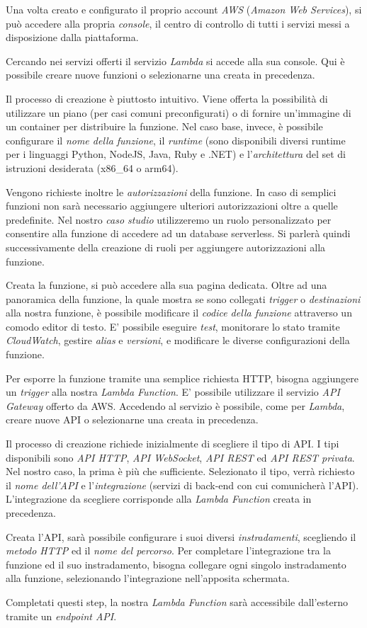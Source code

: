 Una volta creato e configurato il proprio account \textit{AWS} (\textit{Amazon Web Services}), si può accedere alla propria \textit{console}, il centro di controllo di tutti i servizi messi a disposizione dalla piattaforma.

Cercando nei servizi offerti il servizio \textit{Lambda} si accede alla sua console. Qui è possibile creare nuove funzioni o selezionarne una creata in precedenza.

Il processo di creazione è piuttosto intuitivo. Viene offerta la possibilità di utilizzare un piano (per casi comuni preconfigurati) o di fornire un'immagine di un container per distribuire la funzione. Nel caso base, invece, è possibile configurare il \textit{nome della funzione}, il \textit{runtime} (sono disponibili diversi runtime per i linguaggi Python, NodeJS, Java, Ruby e .NET) e l'\textit{architettura} del set di istruzioni desiderata (x86\_64 o arm64).

Vengono richieste inoltre le \textit{autorizzazioni} della funzione. In caso di semplici funzioni non sarà necessario aggiungere ulteriori autorizzazioni oltre a quelle predefinite. Nel nostro \textit{caso studio} utilizzeremo un ruolo personalizzato per consentire alla funzione di accedere ad un database serverless. Si parlerà quindi successivamente della creazione di ruoli per aggiungere autorizzazioni alla funzione.

Creata la funzione, si può accedere alla sua pagina dedicata. Oltre ad una panoramica della funzione, la quale mostra se sono collegati \textit{trigger} o \textit{destinazioni} alla nostra funzione, è possibile modificare il \textit{codice della funzione} attraverso un comodo editor di testo. E' possibile eseguire \textit{test}, monitorare lo stato tramite \textit{CloudWatch}, gestire \textit{alias} e \textit{versioni}, e modificare le diverse configurazioni della funzione.

Per esporre la funzione tramite una semplice richiesta HTTP, bisogna aggiungere un \textit{trigger} alla nostra \textit{Lambda Function}. E' possibile utilizzare il servizio \textit{API Gateway} offerto da AWS. Accedendo al servizio è possibile, come per \textit{Lambda}, creare nuove API o selezionarne una creata in precedenza.

Il processo di creazione richiede inizialmente di scegliere il tipo di API. I tipi disponibili sono \textit{API HTTP}, \textit{API WebSocket}, \textit{API REST} ed \textit{API REST privata}. Nel nostro caso, la prima è più che sufficiente.
Selezionato il tipo, verrà richiesto il \textit{nome dell'API} e l'\textit{integrazione} (servizi di back-end con cui comunicherà l'API). L'integrazione da scegliere corrisponde alla \textit{Lambda Function} creata in precedenza.

Creata l'API, sarà possibile configurare i suoi diversi \textit{instradamenti}, scegliendo il \textit{metodo HTTP} ed il \textit{nome del percorso}. Per completare l'integrazione tra la funzione ed il suo instradamento, bisogna collegare ogni singolo instradamento alla funzione, selezionando l'integrazione nell'apposita schermata.

Completati questi step, la nostra \textit{Lambda Function} sarà accessibile dall'esterno tramite un \textit{endpoint API}.